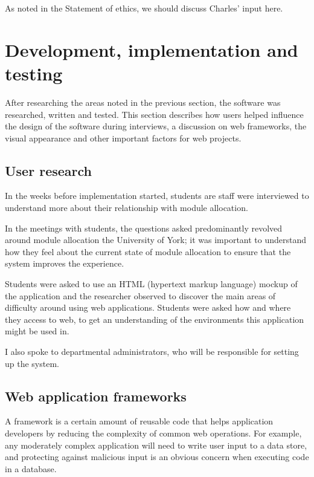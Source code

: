 \documentclass[]{scrartcl}
\begin{document}
As noted in the Statement of ethics, we should discuss Charles' input here.

\section{Development, implementation and testing}


After researching the areas noted in the previous section, the software was
researched, written and tested. This section describes how users helped
influence the design of the software during interviews, a discussion on web
frameworks, the visual appearance and other important factors for web
projects.

\subsection{User research}

In the weeks before implementation started, students are staff were
interviewed to understand more about their relationship with module
allocation.

In the meetings with students, the questions asked predominantly revolved
around module allocation the University of York; it was important to
understand how they feel about the current state of module allocation to
ensure that the system improves the experience.

Students were asked to use an HTML (hypertext markup language) mockup of the
application and the researcher observed to discover the main areas of
difficulty around using web applications. Students were asked how and where
they access to web, to get an understanding of the environments this
application might be used in.


I also spoke to departmental administrators, who will be responsible for setting up
the system.


\subsection{Web application frameworks}

A framework is a certain amount of reusable code that helps application developers by reducing the complexity of common web operations. For example, any moderately complex application will need to write user input to a data store, and protecting against malicious input is an obvious concern when executing code in a database.
\end{document}
